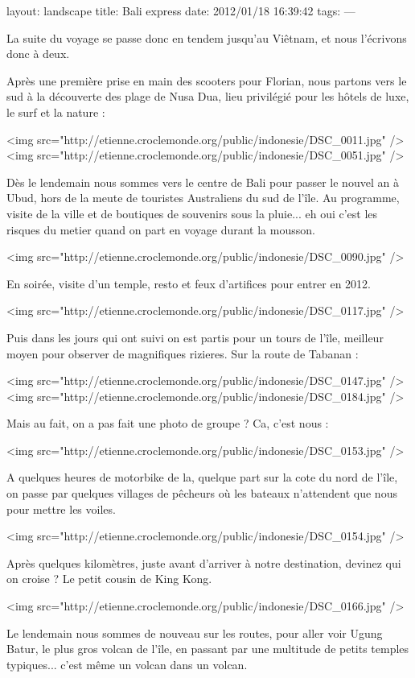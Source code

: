 layout: landscape
title: Bali express
date: 2012/01/18 16:39:42
tags:
---


La suite du voyage se passe donc en tendem jusqu'au Viêtnam, et nous l'écrivons donc à deux.

Après une première prise en main des scooters pour Florian, nous partons vers le sud à la découverte des plage de Nusa Dua, lieu privilégié pour les hôtels de luxe, le surf et la nature :

<img src="http://etienne.croclemonde.org/public/indonesie/DSC_0011.jpg" />
<img src="http://etienne.croclemonde.org/public/indonesie/DSC_0051.jpg" />

Dès le lendemain nous sommes vers le centre de Bali pour passer le nouvel an à Ubud, hors de la meute de touristes Australiens du sud de l'île. Au programme, visite de la ville et de boutiques de souvenirs sous la pluie... eh oui c'est les risques du metier quand on part en voyage durant la mousson.

<img src="http://etienne.croclemonde.org/public/indonesie/DSC_0090.jpg" />

En soirée, visite d'un temple, resto et feux d'artifices pour entrer en 2012.

<img src="http://etienne.croclemonde.org/public/indonesie/DSC_0117.jpg" />

Puis dans les jours qui ont suivi on est partis pour un tours de l'île, meilleur moyen pour observer de magnifiques rizieres. Sur la route de Tabanan :

<img src="http://etienne.croclemonde.org/public/indonesie/DSC_0147.jpg" />
<img src="http://etienne.croclemonde.org/public/indonesie/DSC_0184.jpg" />

Mais au fait, on a pas fait une photo de groupe ? Ca, c'est nous :

<img src="http://etienne.croclemonde.org/public/indonesie/DSC_0153.jpg" />

A quelques heures de motorbike de la, quelque part sur la cote du nord de l'île, on passe par quelques villages de pêcheurs où les bateaux n'attendent que nous pour mettre les voiles.

<img src="http://etienne.croclemonde.org/public/indonesie/DSC_0154.jpg" />

Après quelques kilomètres, juste avant d'arriver à notre destination, devinez qui on croise ? Le petit cousin de King Kong.

<img src="http://etienne.croclemonde.org/public/indonesie/DSC_0166.jpg" />

Le lendemain nous sommes de nouveau sur les routes, pour aller voir Ugung Batur, le plus gros volcan de l'île, en passant par une multitude de petits temples typiques... c'est même un volcan dans un volcan.

